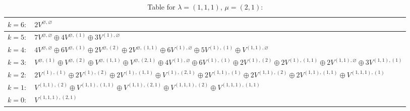 \documentclass[a4paper,12pt]{article}
\begin{document}
\renewcommand{\arraystretch}{1.6} 
\begin{table}[H]
\centering
\caption{Table for $\lambda = (1, 1, 1)$, $\mu = (2, 1)$:}
\begin{tabular}{|>{\centering\arraybackslash}p{15cm}|}
\hline
 $k = 6: \quad 2 V^{\varnothing, \varnothing} $ \\ \hline
 $k = 5: \quad 7 V^{\varnothing, \varnothing} \oplus 4 V^{\varnothing, (1)} \oplus 3 V^{(1), \varnothing} $ \\ \hline
 $k = 4: \quad 4 V^{\varnothing, \varnothing} \oplus 6 V^{\varnothing, (1)} \oplus 2 V^{\varnothing, (2)} \oplus 2 V^{\varnothing, (1, 1)} \oplus 6 V^{(1), \varnothing} \oplus 5 V^{(1), (1)} \oplus V^{(1, 1), \varnothing} $ \\ \hline
 $k = 3: \quad V^{\varnothing, (1)} \oplus V^{\varnothing, (2)} \oplus V^{\varnothing, (1, 1)} \oplus V^{\varnothing, (2, 1)} \oplus 4 V^{(1), \varnothing} \oplus 6 V^{(1), (1)} \oplus 2 V^{(1), (2)} \oplus 2 V^{(1), (1, 1)} \oplus 2 V^{(1, 1), \varnothing} \oplus 3 V^{(1, 1), (1)} $ \\ \hline
 $k = 2: \quad 2 V^{(1), (1)} \oplus 2 V^{(1), (2)} \oplus 2 V^{(1), (1, 1)} \oplus V^{(1), (2, 1)} \oplus 2 V^{(1, 1), (1)} \oplus 2 V^{(1, 1), (2)} \oplus 2 V^{(1, 1), (1, 1)} \oplus V^{(1, 1, 1), (1)} $ \\ \hline
 $k = 1: \quad V^{(1, 1), (2)} \oplus V^{(1, 1), (1, 1)} \oplus V^{(1, 1), (2, 1)} \oplus V^{(1, 1, 1), (2)} \oplus V^{(1, 1, 1), (1, 1)} $ \\ \hline
 $k = 0: \quad V^{(1, 1, 1), (2, 1)} $ \\ \hline
\end{tabular}
\end{table}
\end{document}
